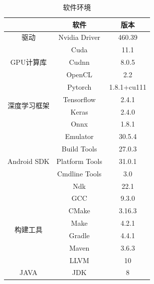 \begin{table}[h!]
    \centering
    \caption{软件环境}
    \label{platform_software}
    \begin{tabular}{c|c|c}
    \hline
                                 & 软件             & 版本          \\ \hline
    驱动                          & Nvidia Driver   & 460.39      \\ \hline
    \multirow{3}{*}{GPU计算库}      & Cuda           & 11.1        \\ \cline{2-3} 
                                 & Cudnn          & 8.0.5       \\ \cline{2-3} 
                                 & OpenCL         & 2.2         \\ \hline
    \multirow{4}{*}{深度学习框架}      & Pytorch        & 1.8.1+cu111 \\ \cline{2-3} 
                                 & Tensorflow     & 2.4.1       \\ \cline{2-3} 
                                 & Keras          & 2.4.0       \\ \cline{2-3} 
                                 & Onnx           & 1.8.1       \\ \hline
    \multirow{5}{*}{Android SDK} & Emulator       & 30.5.4      \\ \cline{2-3} 
                                 & Build Tools    & 27.0.3      \\ \cline{2-3} 
                                 & Platform Tools & 31.0.1      \\ \cline{2-3} 
                                 & Cmdline Tools  & 3.0         \\ \cline{2-3} 
                                 & Ndk            & 22.1        \\ \hline
    \multirow{6}{*}{构建工具}        & GCC            & 9.3.0       \\ \cline{2-3} 
                                 & CMake          & 3.16.3      \\ \cline{2-3} 
                                 & Make           & 4.2.1       \\ \cline{2-3} 
                                 & Gradle         & 4.4.1       \\ \cline{2-3} 
                                 & Maven          & 3.6.3       \\ \cline{2-3} 
                                 & LLVM           & 10          \\ \hline
    JAVA                         & JDK            & 8           \\ \hline
    \end{tabular}
\end{table}

